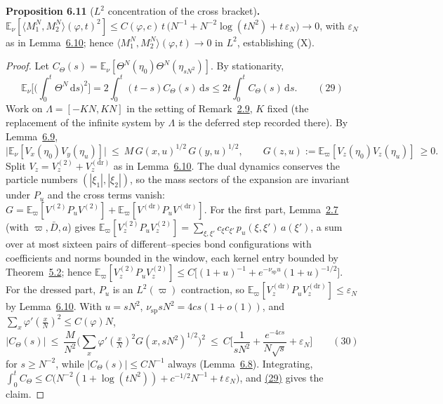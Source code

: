 \documentclass[11pt]{article}
\theoremstyle{plain}
\theoremstyle{definition}
\theoremstyle{remark}
\newcommand{\E}{\mathbb{E}}\newcommand{\PP}{\mathbb{P}}\newcommand{\dd}{\,\mathrm{d}}
\newcommand{\eps}{\varepsilon}\newcommand{\Exp}{\mathrm{Exp}}
\begin{document}
\label{prop_conc}\noindent\textbf{Proposition 6.11} ($L^2$ concentration of the cross bracket)\textbf{.} 
$\E_\nu[\langle M_1^N,M_2^N\rangle(\varphi,t)^2]\le
C(\varphi,c)\,t\,\big(N^{-1}+N^{-2}\log(tN^2)+t\,\eps_N\big)\to0$, with $\eps_N$ as
in Lemma~\hyperref[lem_eps]{6.10}; hence $\langle M_1^N,M_2^N\rangle(\varphi,t)\to0$ in $L^2$,
establishing \textup{(X)}.
\par
\begin{proof}
Let $C_\Theta(s)=\E_\nu[\Theta^N(\eta_0)\Theta^N(\eta_{sN^2})]$. By stationarity,
\label{eq_concstat}
\begin{equation}
  \E_\nu\Big[\Big(\int_0^t\Theta^N\dd s\Big)^2\Big]=2\int_0^t(t-s)C_\Theta(s)\dd s
  \le 2t\int_0^t C_\Theta(s)\dd s.\qquad(29)
\end{equation}
Work on $\Lambda=[-KN,KN]$ in the setting of Remark~\hyperref[rem_orthstatus]{2.9}, $K$ fixed
(the replacement of the infinite system by $\Lambda$ is the deferred step recorded
there). By Lemma~\hyperref[lem_sector]{6.9},
\[
  \big|\E_\nu[V_x(\eta_0)V_y(\eta_u)]\big|\ \le\ M\,G(x,u)^{1/2}\,G(y,u)^{1/2},
  \qquad G(z,u):=\E_\varpi[V_z(\eta_0)V_z(\eta_u)]\ \ge0 .
\]
Split $V_z=V^{(2)}_z+V^{(\mathrm{dr})}_z$ as in Lemma~\hyperref[lem_eps]{6.10}. The dual
dynamics conserves the particle numbers $(|\xi_1|,|\xi_2|)$, so the mass sectors of
the expansion are invariant under $P_u$ and the cross terms vanish:
$G=\E_\varpi[V^{(2)}P_uV^{(2)}]+\E_\varpi[V^{(\mathrm{dr})}P_uV^{(\mathrm{dr})}]$.
For the first part, Lemma~\hyperref[lem_acr]{2.7} (with $\varpi,\bar D,a$) gives
$\E_\varpi[V^{(2)}_zP_uV^{(2)}_z]=\sum_{\xi,\xi'}c_\xi c_{\xi'}\,p_u(\xi,\xi')\,a(\xi')$,
a sum over at most sixteen pairs of different--species bond configurations with
coefficients and norms bounded in the window, each kernel entry bounded by
Theorem~\hyperref[thm_kernel]{5.2}; hence
$\E_\varpi[V^{(2)}_zP_uV^{(2)}_z]\le
C\big[(1+u)^{-1}+e^{-\nu_{\mathrm{sp}}u}(1+u)^{-1/2}\big]$. For the dressed part,
$P_u$ is an $L^2(\varpi)$ contraction, so
$\E_\varpi[V^{(\mathrm{dr})}_zP_uV^{(\mathrm{dr})}_z]\le\eps_N$ by
Lemma~\hyperref[lem_eps]{6.10}. With $u=sN^2$, $\nu_{\mathrm{sp}}sN^2=4cs(1+o(1))$, and
$\sum_x\varphi'(\tfrac xN)^2\le C(\varphi)N$,
\label{eq_Ctheta}
\begin{equation}
  |C_\Theta(s)|\ \le\ \frac{M}{N^2}\Big(\sum_x\varphi'(\tfrac xN)^2G(x,sN^2)^{1/2}\Big)^{\!2}
  \ \le\ C\Big[\frac1{sN^2}+\frac{e^{-4cs}}{N\sqrt s}+\eps_N\Big]\qquad(30)
\end{equation}
for $s\ge N^{-2}$, while $|C_\Theta(s)|\le CN^{-1}$ always (Lemma~\hyperref[lem_eqvar]{6.8}).
Integrating, $\int_0^tC_\Theta\le
C\big(N^{-2}(1+\log(tN^2))+c^{-1/2}N^{-1}+t\,\eps_N\big)$, and \hyperref[eq_concstat]{(29)}
gives the claim.
\end{proof}
\end{document}
